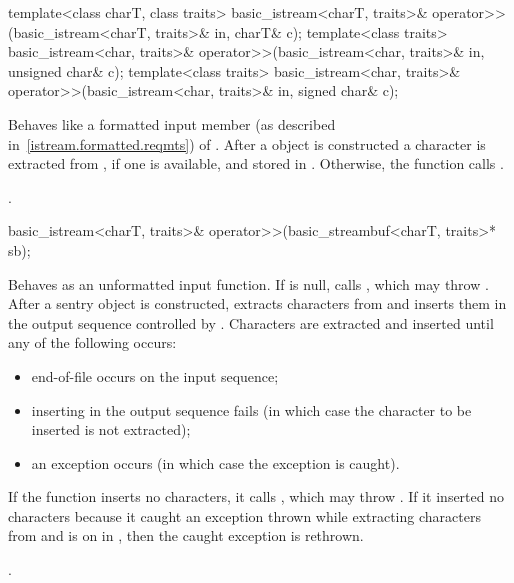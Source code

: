 %
\begin{itemdecl}
template<class charT, class traits>
  basic_istream<charT, traits>& operator>>(basic_istream<charT, traits>& in, charT& c);
template<class traits>
  basic_istream<char, traits>& operator>>(basic_istream<char, traits>& in, unsigned char& c);
template<class traits>
  basic_istream<char, traits>& operator>>(basic_istream<char, traits>& in, signed char& c);
\end{itemdecl}

\begin{itemdescr}
\pnum
\effects
Behaves like a formatted input member (as described in~\ref{istream.formatted.reqmts})
of .
After a
object is constructed
a character is extracted from , if one is available, and stored in .
Otherwise, the function calls
.

\pnum
\returns
{}.
\end{itemdescr}

%
\begin{itemdecl}
basic_istream<charT, traits>& operator>>(basic_streambuf<charT, traits>* sb);
\end{itemdecl}

\begin{itemdescr}
\pnum
\effects
Behaves as an unformatted input function.
If  is null, calls
,
which may throw
.
After a sentry object is constructed, extracts
characters from
and inserts them in the output sequence controlled by .
Characters are extracted and inserted until any of the following occurs:
\begin{itemize}
\item
end-of-file occurs on the input sequence;
\item
inserting in the output sequence fails
(in which case the character to be inserted is not extracted);
\item
an exception occurs (in which case the exception is caught).
\end{itemize}

\pnum
If the function inserts no characters, it calls
,
which may throw
.
If it inserted no characters because it caught
an exception thrown while extracting characters from
and
is on in
,
then the caught exception is rethrown.

\pnum
\returns
{}.
\end{itemdescr}

